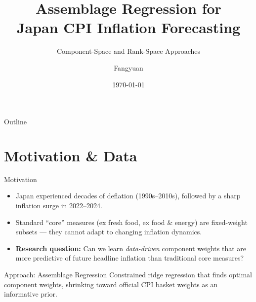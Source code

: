 \documentclass[aspectratio=169, 11pt]{beamer}
\title[Japan CPI Assemblage Regression]{%
  Assemblage Regression for\\Japan CPI Inflation Forecasting}
\subtitle{Component-Space and Rank-Space Approaches}
\author[F.\ Yuan]{Fangyuan}
\institute[MSFE]{Master of Science in Financial Engineering}
\date{\today}
\begin{document}
\begin{frame}[plain]
  \titlepage
\end{frame}

\begin{frame}{Outline}
  \tableofcontents
\end{frame}

\section{Motivation \& Data}

\begin{frame}{Motivation}
  \begin{itemize}
    \item Japan experienced decades of deflation (1990s--2010s), followed by a sharp
          inflation surge in 2022--2024.
    \item Standard ``core'' measures (ex fresh food, ex food \& energy) are
          \alert{fixed-weight subsets} --- they cannot adapt to changing inflation dynamics.
    \item \textbf{Research question:} Can we learn \emph{data-driven} component weights
          that are more predictive of future headline inflation than
          traditional core measures?
  \end{itemize}
  \vfill
  \begin{block}{Approach: Assemblage Regression}
    Constrained ridge regression that finds optimal component weights, shrinking
    toward official CPI basket weights as an informative prior.
  \end{block}
\end{frame}
\end{document}
